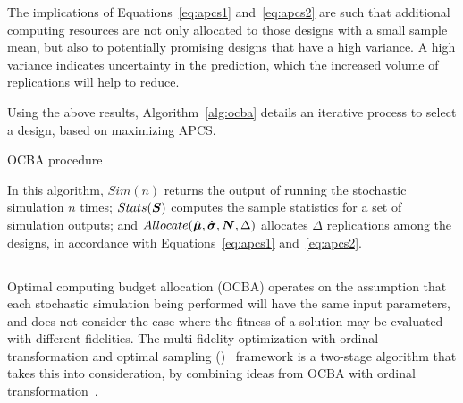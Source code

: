 The implications of Equations~\ref{eq:apcs1} and~\ref{eq:apcs2} are such that additional computing resources are not only allocated to those designs with a small sample mean, but also to potentially promising designs that have a high variance. A high variance indicates uncertainty in the prediction, which the increased volume of replications will help to reduce.

Using the above results, Algorithm~\ref{alg:ocba} details an iterative process to select a design, based on maximizing APCS.

\begin{algorithm}[h!] 
\caption{OCBA procedure}
\label{alg:ocba}
{\footnotesize
\begin{algorithmic}[1]
 
 
 
\label{while-loop}
   
   
   
   
   
\ENDWHILE
\end{algorithmic}
}
\end{algorithm}

In this algorithm, $Sim(n)$ returns the output of running the stochastic simulation $n$ times; $Stats(\boldsymbol{S})$ computes the sample statistics for a set of simulation outputs; and $Allocate(\boldsymbol{\hat{\mu}},\boldsymbol{\hat{\sigma}},\boldsymbol{N},\Delta)$ allocates $\Delta$ replications among the designs, in accordance with Equations~\ref{eq:apcs1} and~\ref{eq:apcs2}.

\subsection{\motos{}}
Optimal computing budget allocation (OCBA) operates on the assumption that each stochastic simulation being performed will have the same input parameters, and does not consider the case where the fitness of a solution may be evaluated with different fidelities. The multi-fidelity optimization with ordinal transformation and optimal sampling (\motos{})~\cite{xu2016mo2tos} framework is a two-stage algorithm that takes this into consideration, by combining ideas from OCBA with ordinal transformation~\cite{xu2014ordinal}.

